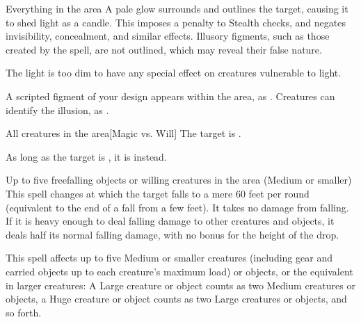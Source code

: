 \begin{comment}
\subsubsection{F}
\end{comment}

\spelldur{\durshort \dismissable}
\begin{spelltarget}{Everything in the area}
    \spelleffect A pale glow surrounds and outlines the target, causing it to shed light as a candle. This imposes a  penalty to Stealth checks, and negates invisibility, concealment, and similar effects. Illusory figments, such as those created by the  spell, are not outlined, which may reveal their false nature.
\end{spelltarget}
\spellnotes The light is too dim to have any special effect on creatures vulnerable to light.

\spelldur{\durlong \dismissable}
\spellline
\spelleffect A scripted figment of your design appears within the area, as .
\spellnotes Creatures can identify the illusion, as .

\spelldur{\durshort \dismissable}
\begin{spelltarget}{All creatures in the area}[Magic vs. Will]
    \spellsuccess The target is \shaken.

    As long as the target is \bloodied, it is \frightened instead.
\end{spelltarget}

\begin{spelltargets}{Up to five freefalling objects or willing creatures in the area (Medium or smaller)}
    \spelleffect This spell changes at which the target falls to a mere 60 feet per round (equivalent to the end of a fall from a few feet). It takes no damage from falling. If it is heavy enough to deal falling damage to other creatures and objects, it deals half its normal falling damage, with no bonus for the height of the drop.
\end{spelltargets}
\spellnotes This spell affects up to five Medium or smaller creatures (including gear and carried objects up to each creature's maximum load) or objects, or the equivalent in larger creatures: A Large creature or object counts as two Medium creatures or objects, a Huge creature or object counts as two Large creatures or objects, and so forth.

